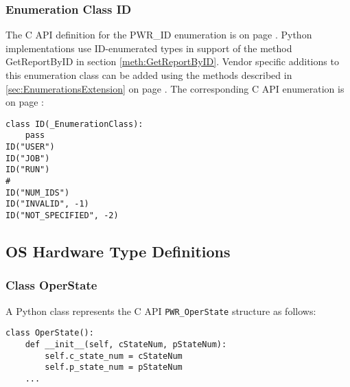 \subsubsection{Enumeration Class ID}\label{class:ID}

The C API definition for the PWR_ID enumeration is on page \pageref{type:ID}.
Python implementations use ID-enumerated types in support of the method
GetReportByID in section \ref{meth:GetReportByID}. Vendor specific additions to
this enumeration class can be added using the methods described in
\ref{sec:EnumerationsExtension} on page \pageref{sec:EnumerationsExtension}.
The corresponding C API enumeration is on page \pageref{type:ID}:

\begin{center}\begin{minipage}{.95\linewidth}\begin{lstlisting}
class ID(_EnumerationClass):
    pass
ID("USER")
ID("JOB")
ID("RUN")
#
ID("NUM_IDS")
ID("INVALID", -1)
ID("NOT_SPECIFIED", -2)
\end{lstlisting}\end{minipage}\end{center}

\subsection{OS Hardware Type Definitions}\label{sec:PythonOSHardwareTypeDefinitions}

\subsubsection{Class OperState} \label{class:OperState}

A Python class represents the C API \texttt{PWR_OperState} structure as follows:

\begin{center}\begin{minipage}{.95\linewidth}\begin{lstlisting}
class OperState():
    def __init__(self, cStateNum, pStateNum):
        self.c_state_num = cStateNum
        self.p_state_num = pStateNum
    ...
\end{lstlisting}\end{minipage}\end{center}

